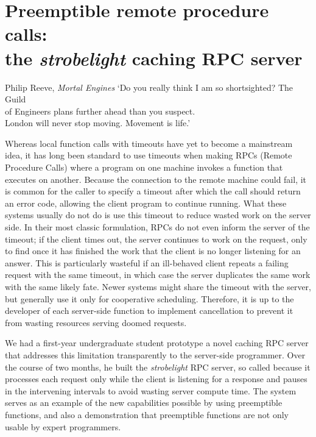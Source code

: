 \chapter{Preemptible remote procedure calls: \\ the \textit{strobelight} caching RPC server}
\label{chap:strobelight}

\ifdefined\chapquotes
\vspace{-1in}
\begin{chapquote}[1.5in]{Philip Reeve, \textit{Mortal Engines}}
`Do you really think I am so shortsighted?  The Guild \\
of Engineers plans further ahead than you suspect. \\
London will never stop moving.  Movement is life.'
\end{chapquote}
\fi

Whereas local function calls with timeouts have yet to become a mainstream idea, it
has long been standard to use timeouts when making RPCs (Remote Procedure Calls)
where a program on one machine invokes a function that executes on another.  Because
the connection to the remote machine could fail, it is common for the caller to
specify a timeout after which the call should return an error code, allowing the
client program to continue running.  What these systems usually do not do is use this
timeout to reduce wasted work on the server side.  In their most classic formulation,
RPCs do not even inform the server of the timeout; if the client times out, the
server continues to work on the request, only to find once it has finished the work
that the client is no longer listening for an answer.  This is particularly wasteful
if an ill-behaved client repeats a failing request with the same timeout, in which
case the server duplicates the same work with the same likely fate.  Newer systems
might share the timeout with the server, but generally use it only for cooperative
scheduling.  Therefore, it is up to the developer of each server-side function to
implement cancellation to prevent it from wasting resources serving doomed requests.

We had a first-year undergraduate student prototype a novel caching RPC server that
addresses this limitation transparently to the server-side programmer.  Over the
course of two months, he built the \textit{strobelight} RPC server, so called because
it processes each request only while the client is listening for a response and
pauses in the intervening intervals to avoid wasting server compute time.  The system
serves as an example of the new capabilities possible by using preemptible functions,
and also a demonstration that preemptible functions are not only usable by expert
programmers.


